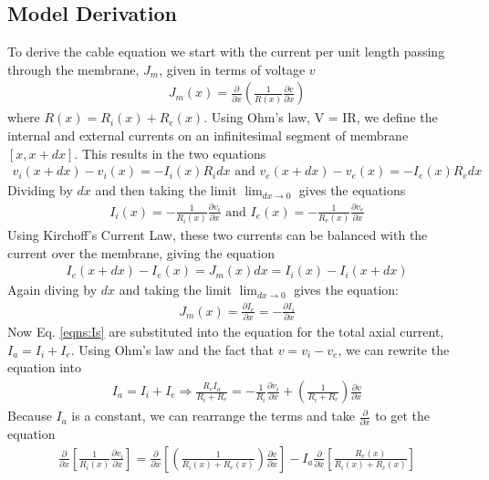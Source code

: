 \documentclass{article}
\begin{document}
\subsection{Model Derivation}
 To derive the cable equation we start with the current per unit length passing through the membrane, $J_{m}$, given in terms of voltage $v$
 \begin{gather*}
     J_{m}(x) = \frac{\partial}{\partial x} \left( \frac{1}{R(x)}\frac{\partial v}{\partial x} \right)
 \end{gather*}
 where $R(x) = R_{i}(x) + R_{e}(x)$. Using Ohm's law, V = IR, we define the internal and external currents on an infinitesimal segment of membrane $[x,x+dx]$. This results in the two equations
 \begin{gather*}
     v_{i}(x+dx) - v_{i}(x) = - I_{i}(x)R_{i}dx \textrm{ and } v_{e}(x+dx) - v_{e}(x) = - I_{e}(x)R_{e}dx
 \end{gather*}
 Dividing by $dx$ and then taking the limit $\lim_{dx\to0}$ gives the equations
 \begin{gather}  \label{eqns:Is}
     I_{i}(x) = -\frac{1}{R_{i}(x)}\frac{\partial v_{i}}{\partial x}\textrm{ and }I_{e}(x) = -\frac{1}{R_{e}(x)}\frac{\partial v_{e}}{\partial x}
 \end{gather}
 Using Kirchoff's Current Law, these two currents can be balanced with the current over the membrane, giving the equation
 \begin{gather*}
     I_{e}(x+dx) - I_{e}(x) = J_{m}(x)dx = I_{i}(x) - I_{i}(x+dx)
 \end{gather*}
 Again diving by $dx$ and taking the limit $\lim_{dx\to0}$ gives the equation:
 \begin{gather}  \label{eqns:Jm_in_I}
     J_{m}(x) = \frac{\partial I_{e}}{\partial x} = - \frac{\partial I_{i}}{\partial x}
 \end{gather}
 Now Eq. \ref{eqns:Is} are substituted into the equation for the total axial current, $I_{a} = I_{i} + I_{e}$. Using Ohm's law and the fact that $v = v_{i} - v_{e}$, we can rewrite the equation into
 \begin{gather*}
     I_{a} = I_{i} + I_{e} \Rightarrow \frac{R_{e}I_{a}}{R_{i} + R_{e}} = - \frac{1}{R_{i}}\frac{\partial v_{i}}{\partial x} + \left( \frac{1}{R_{i} + R_{e}} \right)\frac{\partial v}{\partial x}
 \end{gather*}
 Because $I_{a}$ is a constant, we can rearrange the terms and take $\frac{\partial}{\partial x}$ to get the equation
 \begin{gather*}
     \frac{\partial}{\partial x} \left[ \frac{1}{R_{i}(x)}\frac{\partial v_{i}}{\partial x} \right] = \frac{\partial}{\partial x} \left[ \left ( \frac{1}{R_{i}(x) + R_{e}(x)} \right) \frac{\partial v}{\partial x} \right] - I_{a} \frac{\partial}{\partial x} \left[ \frac{R_{e}(x)}{R_{i}(x) + R_{e}(x)} \right]
 \end{gather*}
\end{document}
